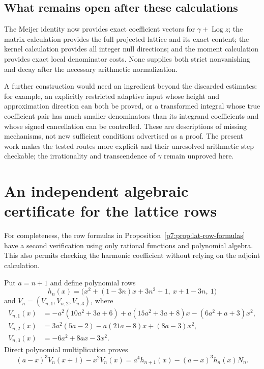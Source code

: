 \documentclass[11pt,a4paper]{article}
\theoremstyle{definition}
\theoremstyle{remark}
\DeclareMathOperator{\Log}{Log}
\numberwithin{equation}{section}
\renewcommand{\thesection}{\Roman{part}.\arabic{section}}
\renewcommand{\theHsection}{\arabic{part}.main.\arabic{section}}
\newcommand{\PartAppendix}{%
 \setcounter{section}{0}\setcounter{subsection}{0}%
 \renewcommand{\thesection}{\Roman{part}.\Alph{section}}%
 \renewcommand{\theHsection}{\arabic{part}.appendix.\arabic{section}}}
\begin{document}
\subsection{What remains open after these calculations}

The Meijer identity now provides exact coefficient vectors for
$\gamma+\Log z$; the matrix calculation provides the full projected
lattice and its exact content; the kernel calculation provides all
integer null directions; and the moment calculation provides exact
local denominator costs. None supplies both strict nonvanishing and
decay after the necessary arithmetic normalization.

A further construction would need an ingredient beyond the discarded
estimates: for example, an explicitly restricted adaptive input whose
height and approximation direction can both be proved, or a transformed
integral whose true coefficient pair has much smaller denominators than
its integrand coefficients and whose signed cancellation can be
controlled. These are descriptions of missing mechanisms, not new
sufficient conditions advertised as a proof. The present work makes the
tested routes more explicit and their unresolved arithmetic step
checkable; the irrationality and transcendence of $\gamma$ remain
unproved here.

\PartAppendix
\section{An independent algebraic certificate for the lattice rows}
\label{p7:app:telescoping}

For completeness, the row formulas in
Proposition~\ref{p7:prop:lat-row-formulas} have a second verification using
only rational functions and polynomial algebra. This also permits
checking the harmonic coefficient without relying on the adjoint
calculation.

Put $a=n+1$ and define polynomial rows
\[
 h_n(x)=\bigl(x^2+(1-3n)x+3n^2+1,\ x+1-3n,\ 1\bigr)
\]
and $V_n=(V_{n,1},V_{n,2},V_{n,3})$, where
\begin{align*}
 V_{n,1}(x)
 &=-a^2(10a^2+3a+6)+a(15a^2+3a+8)x
                     -(6a^2+a+3)x^2,\\
 V_{n,2}(x)
 &=3a^2(5a-2)-a(21a-8)x+(8a-3)x^2,\\
 V_{n,3}(x)&=-6a^2+8ax-3x^2.
\end{align*}
Direct polynomial multiplication proves
\begin{equation}
\label{p7:eq:tel-certificate}
 (a-x)^3V_n(x+1)-x^2V_n(x)
 =a^4h_{n+1}(x)-(a-x)^3h_n(x)N_n.
\end{equation}
\end{document}

